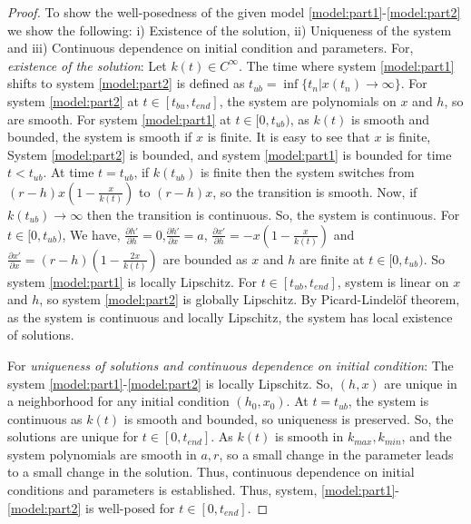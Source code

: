 \documentclass[sn-mathphys-num]{sn-jnl}
\numberwithin{equation}{section}
\numberwithin{equation}{section}
\begin{document}
\begin{proof}
To show the well-posedness of the given model \ref{model:part1}-\ref{model:part2} we show the following:
 i) Existence of the solution,
ii) Uniqueness of the system and iii) Continuous dependence on initial condition and parameters. For, \textit{existence of the solution}:
Let $k(t) \in C^\infty$. The time where system \ref{model:part1} shifts to system \ref{model:part2} is defined as $t_{ub}=\inf{\{ t_n | x(t_n) \to \infty \}} $. For system \ref{model:part2} at $t \in [t_{bu},t_{end}]$, the system are polynomials on $x$ and $h$, so are smooth. For system \ref{model:part1} at $t \in [0,t_{ub})$, as $k(t)$ is smooth and bounded, the system is smooth if $x$ is finite. It is easy to see that $x$ is finite, System \ref{model:part2} is bounded, and system \ref{model:part1} is bounded for time $t<t_{ub}$. At time $t=t_{ub}$, if $k(t_{ub})$ is finite then the system switches from $(r - h) x \left(1 - \frac{x}{k(t)}\right)$ to $(r - h) x $, so the transition is smooth.
Now, if $k(t_{ub}) \to \infty$ then the transition is continuous. So, the system is continuous. For $t \in [0,t_{ub})$, We have, $\frac{\partial h'}{\partial h}=0$,$\frac{\partial h'}{\partial x}=a$,
$\frac{\partial x'}{\partial h}=-x(1-\frac{x}{k(t)})$ and $\frac{\partial x'}{\partial x}=(r-h)(1-\frac{2x}{k(t)})$ are bounded as $x$ and $h$ are finite at $t \in [0,t_{ub})$. So system \ref{model:part1} is locally Lipschitz. For $t \in [t_{ub},t_{end}]$, system is linear on $x$ and $h$, so system \ref{model:part2} is globally Lipschitz. By Picard-Lindelöf theorem, as the system is continuous and locally Lipschitz, the system has local existence of solutions. 

For \textit{uniqueness of solutions and continuous dependence on initial condition}:
The system \ref{model:part1}-\ref{model:part2} is locally Lipschitz. So, $(h,x)$ are unique in a neighborhood for any initial condition $(h_0,x_0)$. At $t=t_{ub}$, the system is continuous as $k(t)$ is smooth and bounded, so uniqueness is preserved. So, the solutions are unique for $t \in [0,t_{end}]$. As $k(t)$ is smooth in $k_{max},k_{min}$, and the system polynomials are smooth in $a,r$, so a small change in the parameter leads to a small change in the solution. Thus, continuous dependence on initial conditions and parameters is established.
Thus, system, \ref{model:part1}-\ref{model:part2} is well-posed for $t\in [0,t_{end}]$.
\end{proof}
\end{document}
